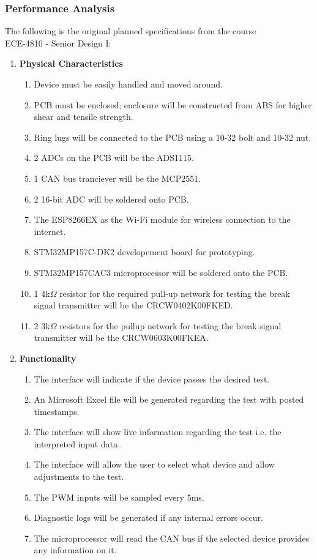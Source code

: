 \documentclass[12pt]{article}
\begin{document}
\subsubsection{Performance Analysis}
The following is the original planned specifications from the course \\ECE-4810 - Senior Design I:

\begin{enumerate}[label=\arabic*.]
  \item \textbf{Physical Characteristics}
    \begin{enumerate}[label=\theenumi\arabic*]
      \item Device must be easily handled and moved around.
      \item PCB must be enclosed; enclosure will be constructed from ABS for 
        higher shear and tensile strength.
      \item Ring lugs will be connected to the PCB using a 10-32 bolt and 10-32 
        nut.
      \item 2 ADCs on the PCB will be the ADS1115.
      \item 1 CAN bus tranciever will be the MCP2551.
      \item 2 16-bit ADC will be soldered onto PCB.
      \item The ESP8266EX as the Wi-Fi module for wireless connection to the 
        internet.
      \item STM32MP157C-DK2 developement board for prototyping.
      \item STM32MP157CAC3 microprocessor will be soldered onto the PCB.
      \item 1 4k$\Omega$ resistor for the required pull-up network for testing the 
        break signal transmitter will be the CRCW0402K00FKED.
      \item 2 3k$\Omega$ resistors for the pullup network for testing the break signal 
        transmitter will be the CRCW0603K00FKEA.
    \end{enumerate}
  \item \textbf{Functionality}
    \begin{enumerate}[label=\theenumi\arabic*]
      \item The interface will indicate if the device passes the desired test.
      \item An Microsoft Excel file will be generated regarding the test with 
        posted timestamps.
      \item The interface will show live information regarding the test i.e. the 
        interpreted input data.
      \item The interface will allow the user to select what device and allow 
        adjustments to the test.
      \item The PWM inputs will be sampled every 5ms.
      \item Diagnostic logs will be generated if any internal errors occur.
      \item The microprocessor will read the CAN bus if the selected device 
        provides any information on it.
    \end{enumerate}
\end{enumerate}
\end{document}
